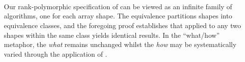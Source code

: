 \begin{code}[hide]
\AgdaSpace{}%
\AgdaSpace{}%
\AgdaSpace{}%
\AgdaSymbol{\AgdaUnderscore{}}\AgdaSpace{}%
\<%
\\
%
\>[4]\AgdaSpace{}%
\AgdaSpace{}%
\AgdaSpace{}%
\AgdaSpace{}%
\AgdaSymbol{(}\AgdaSpace{}%
\AgdaSpace{}%
\AgdaSpace{}%
\AgdaSpace{}%
\AgdaSymbol{)}%
\>[41]\AgdaSpace{}%
\AgdaSpace{}%
\AgdaSpace{}%
\AgdaSpace{}%
\AgdaSpace{}%
\AgdaSpace{}%
\<%
\\
%
\>[4]\AgdaSpace{}%
\AgdaSpace{}%
\AgdaSpace{}%
\AgdaSpace{}%
\AgdaSymbol{(}\AgdaSpace{}%
\AgdaSpace{}%
\AgdaSpace{}%
\AgdaSpace{}%
\AgdaSymbol{)}\<%
\\
%
\>[4]\AgdaSpace{}%
\AgdaSpace{}%
\AgdaSpace{}%
\<%
\end{code}

Our rank-polymorphic specification of  can be viewed as an infinite
family of algorithms, one for each array shape.  The  equivalence
partitions shapes into equivalence classes, and the foregoing proof establishes
that  applied to any two shapes within the same class yields identical
results.  In the ``what/how'' metaphor, the \emph{what} remains unchanged whilst the
\emph{how} may be systematically varied through the application of .



